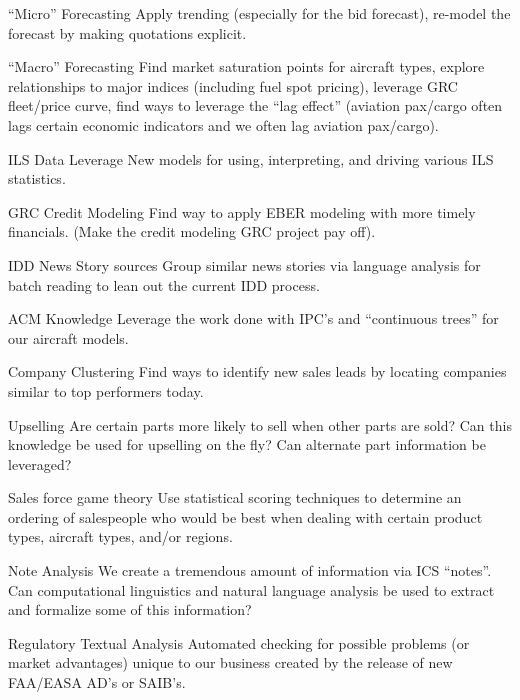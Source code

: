 \documentclass[10pt,journal,compsoc]{IEEEtran}
\begin{document}
\begin{LaTeXdescription}
    \item[``Micro'' Forecasting]
        Apply trending (especially for the bid forecast), re-model the forecast by
        making quotations explicit.

    \item[``Macro'' Forecasting]
        Find market saturation points for aircraft types, explore relationships to
        major indices (including fuel spot pricing), leverage GRC fleet/price
        curve, find ways to leverage the ``lag effect'' (aviation pax/cargo often
        lags certain economic indicators and we often lag aviation pax/cargo).

    \item[ILS Data Leverage]
        New models for using, interpreting, and driving various ILS statistics.

    \item[GRC Credit Modeling]
        Find way to apply EBER modeling with more timely financials. (Make the
        credit modeling GRC project pay off).

    \item[IDD News Story sources]
        Group similar news stories via language analysis for batch reading to
        lean out the current IDD process.

    \item[ACM Knowledge]
        Leverage the work done with IPC's and ``continuous trees'' for our
        aircraft models.

    \item[Company Clustering]
        Find ways to identify new sales leads by locating companies similar to
        top performers today.

    \item[Upselling]
        Are certain parts more likely to sell when other parts are sold?  Can
        this knowledge be used for upselling on the fly?  Can alternate part
        information be leveraged?

    \item[Sales force game theory]
        Use statistical scoring techniques to determine an ordering of
        salespeople who would be best when dealing with certain product types,
        aircraft types, and/or regions.

    \item[Note Analysis]
        We create a tremendous amount of information via ICS ``notes''.  Can
        computational linguistics and natural language analysis be used to
        extract and formalize some of this information?

    \item[Regulatory Textual Analysis]
        Automated checking for possible problems (or market advantages)
        unique to our business created by the release of new FAA/EASA AD's
        or SAIB's.

    \end{LaTeXdescription}
\end{document}
